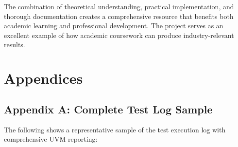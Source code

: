 \documentclass[12pt,a4paper]{article}
\begin{document}
The combination of theoretical understanding, practical implementation, and thorough documentation creates a comprehensive resource that benefits both academic learning and professional development. The project serves as an excellent example of how academic coursework can produce industry-relevant results.

\section{Appendices}

\subsection{Appendix A: Complete Test Log Sample}
The following shows a representative sample of the test execution log with comprehensive UVM reporting:
\end{document}
